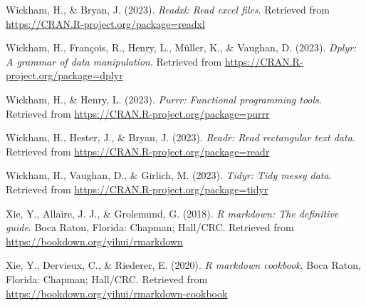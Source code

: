 \documentclass[
  man,floatsintext]{apa6}
\newlength{\cslhangindent}
\newlength{\cslentryspacingunit} %
\newenvironment{CSLReferences}[2] %
 {%
  \setlength{\parindent}{0pt}
  \ifodd #1
  \let\oldpar\par
  \def\par{\hangindent=\cslhangindent\oldpar}
  \fi
  \setlength{\parskip}{#2\cslentryspacingunit}
 }%
 {}
\begin{document}
\begin{CSLReferences}{1}{0}
\leavevmode{}%
Wickham, H., \& Bryan, J. (2023). \emph{Readxl: Read excel files}. Retrieved from \url{https://CRAN.R-project.org/package=readxl}

\leavevmode{}%
Wickham, H., François, R., Henry, L., Müller, K., \& Vaughan, D. (2023). \emph{Dplyr: A grammar of data manipulation}. Retrieved from \url{https://CRAN.R-project.org/package=dplyr}

\leavevmode{}%
Wickham, H., \& Henry, L. (2023). \emph{Purrr: Functional programming tools}. Retrieved from \url{https://CRAN.R-project.org/package=purrr}

\leavevmode{}%
Wickham, H., Hester, J., \& Bryan, J. (2023). \emph{Readr: Read rectangular text data}. Retrieved from \url{https://CRAN.R-project.org/package=readr}

\leavevmode{}%
Wickham, H., Vaughan, D., \& Girlich, M. (2023). \emph{Tidyr: Tidy messy data}. Retrieved from \url{https://CRAN.R-project.org/package=tidyr}

\leavevmode{}%
Xie, Y., Allaire, J. J., \& Grolemund, G. (2018). \emph{R markdown: The definitive guide}. Boca Raton, Florida: Chapman; Hall/CRC. Retrieved from \url{https://bookdown.org/yihui/rmarkdown}

\leavevmode{}%
Xie, Y., Dervieux, C., \& Riederer, E. (2020). \emph{R markdown cookbook}. Boca Raton, Florida: Chapman; Hall/CRC. Retrieved from \url{https://bookdown.org/yihui/rmarkdown-cookbook}

\end{CSLReferences}
\end{document}
